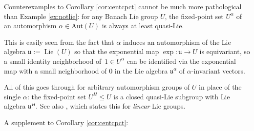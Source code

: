 \documentclass[10pt,a4paper]{amsart}
\numberwithin{equation}{section}
\newcommand\fu{{\mathfrak u}}
\begin{document}
\begin{Remark}\label{re:centnotbad}
 Counterexamples to Corollary \ref{cor:centcpct} cannot be much more pathological than Example \ref{ex:notlie}: for any Banach Lie group $U$, the fixed-point set $U^{\alpha}$ of an automorphism ${\alpha\in \mathrm{Aut}(U)}$ is always at least quasi-Lie.

 This is easily seen from the fact that $\alpha$ induces an automorphism of the Lie algebra ${\fu\!:=\!\operatorname{Lie}(U)}$ so that the exponential map $\exp\colon\fu\to U$ is equivariant, so a small identity neighborhood of~$1\in U^{\alpha}$ can be identified via the exponential map with a small neighborhood of $0$ in the Lie algebra $\fu^{\alpha}$ of $\alpha$-invariant vectors.

 All of this goes through for arbitrary automorphism groups of $U$ in place of the single $\alpha$: the fixed-point set $U^H\le U$ is a closed quasi-Lie subgroup with Lie algebra $\fu^H$. See also \cite[Proposition 5.54\,(ii)]{hm4}, which states this for {\it linear} Lie groups.
\end{Remark}

A supplement to Corollary \ref{cor:centcpct}:
\end{document}

